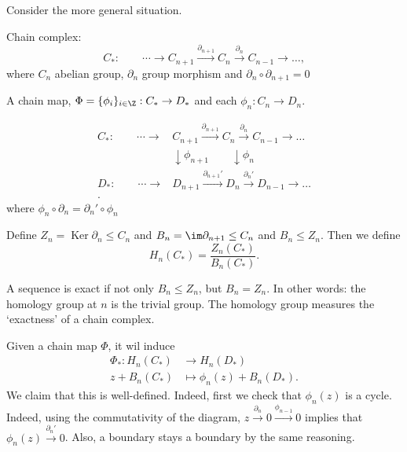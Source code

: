 
Consider the more general situation.
\begin{definition}
    Chain complex:
    \[
    C_*: \qquad \cdots \to  C_{n+1} \xrightarrow{\partial _{n+1}}   C_n \xrightarrow{\partial _n}   C_{n-1} \to  \ldots
    ,\] 
    where $C_n$ abelian group, $\partial_n$ group morphism and $\partial _n  \circ  \partial _{n+1} = 0$
\end{definition}

\begin{definition}
    A chain map, $\Phi = \{ \phi_i\}_{i \in \Z}: C_* \to  D_*$ and each $\phi_n: C_n \to  D_n$.

    \begin{align*}
        C_*: \qquad \cdots \to  &C_{n+1} \xrightarrow{\partial _{n+1}}   C_n \xrightarrow{\partial _n}   C_{n-1} \to  \ldots\\
        &\downarrow \phi_{n+1} \qquad \downarrow \phi_{n}\\
        D_*: \qquad \cdots \to  &D_{n+1} \xrightarrow{\partial_{n+1}'}   D_n \xrightarrow{\partial _n'}   D_{n-1} \to  \ldots\\
    .\end{align*}
    where $\phi_n  \circ  \partial_n = \partial_n'  \circ  \phi_n$

    Define $Z_n = \operatorname{Ker} \partial_n \le  C_n$ and $B_n = \im \partial_{n+1} \le  C_n$ and $B_n \le  Z_n$.
    Then we define
    \[
        H_n(C_*) = \frac{Z_n(C_*)}{B_n(C_*)}
    .\] 
\end{definition}
\begin{definition}
    A sequence is exact if not only $B_n \le  Z_n$, but $B_n = Z_n$.
    In other words: the homology group at $n$ is  the trivial group.
    The homology group measures the `exactness' of a chain complex.
\end{definition}

Given a chain map $\Phi$, it wil induce
\begin{align*}
    \Phi_*: H_n(C_*) &\longrightarrow H_n(D_*) \\
    z + B_n(C_*) &\longmapsto \phi_n(z) + B_n(D_*)
.\end{align*}
We claim that this is well-defined.
Indeed, first we check that $\phi_n(z)$ is a cycle. Indeed, using the commutativity of the diagram, $z \xrightarrow{\partial_n}  0 \xrightarrow{\phi_{n-1}} 0$ implies that $\phi_n(z) \xrightarrow{\partial_n'} 0$.
Also, a boundary stays a boundary by the same reasoning.

